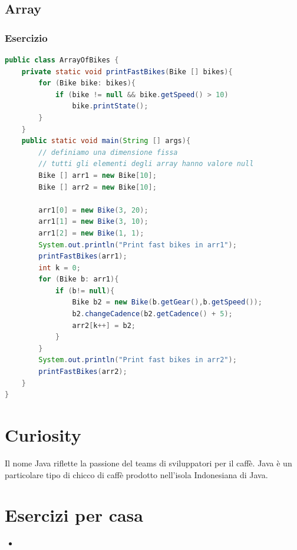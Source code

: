 \documentclass{article}
\theoremstyle{definition}
\begin{document}
\subsection{Array}
\subsubsection{Esercizio}

\begin{lstlisting}[language=Java,escapechar=|]
public class ArrayOfBikes {
	private static void printFastBikes(Bike [] bikes){
		for (Bike bike: bikes){
			if (bike != null && bike.getSpeed() > 10)
				bike.printState();
		}
	}
	public static void main(String [] args){
		// definiamo una dimensione fissa 
		// tutti gli elementi degli array hanno valore null
		Bike [] arr1 = new Bike[10]; 
		Bike [] arr2 = new Bike[10];
		
		arr1[0] = new Bike(3, 20);
		arr1[1] = new Bike(3, 10);
		arr1[2] = new Bike(1, 1);
		System.out.println("Print fast bikes in arr1");
		printFastBikes(arr1);
		int k = 0;
		for (Bike b: arr1){
			if (b!= null){
				Bike b2 = new Bike(b.getGear(),b.getSpeed());
				b2.changeCadence(b2.getCadence() + 5);
				arr2[k++] = b2;
			}				
		}
		System.out.println("Print fast bikes in arr2");
		printFastBikes(arr2);
	}
}
\end{lstlisting}
\section{Curiosity}
\begin{framed}
Il nome  Java riflette la passione del teams di sviluppatori per il caff\`e. Java \`e un particolare tipo di chicco di caff\`e prodotto nell'isola  Indonesiana  di Java.
\end{framed}

\section{Esercizi per casa}
\begin{itemize}
\item 
\end{itemize}

\clearpage







\nocite{*}
\end{document}
